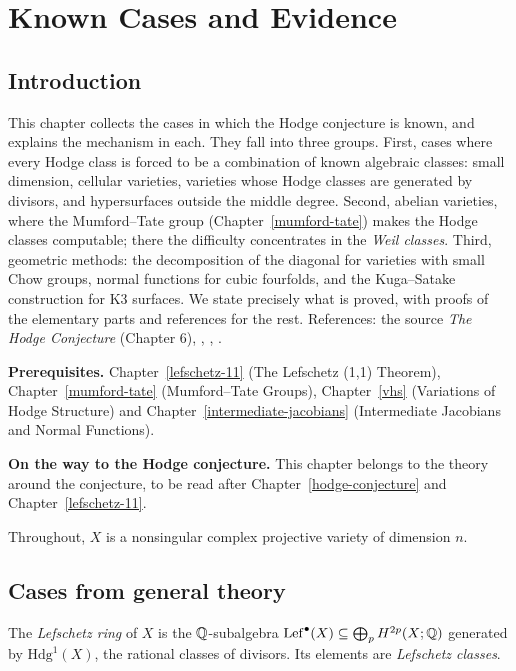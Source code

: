 \chapter{Known Cases and Evidence}\label{known-cases}

\section{Introduction}\label{known-cases:section-introduction}

This chapter collects the cases in which the Hodge conjecture is known, and explains the mechanism in each. They fall into three groups. First, cases where every Hodge class
is forced to be a combination of known algebraic classes: small dimension, cellular varieties, varieties whose Hodge classes are generated by divisors, and hypersurfaces outside the middle
degree. Second, abelian varieties, where the Mumford--Tate group (Chapter~\ref{mumford-tate}) makes the Hodge classes computable; there the difficulty concentrates in the \emph{Weil classes}.
Third, geometric methods: the decomposition of the diagonal for varieties with small Chow groups, normal functions for cubic fourfolds, and the Kuga--Satake construction for K3 surfaces.
We state precisely what is proved, with proofs of the elementary parts and references for the rest. References: the source \emph{The Hodge Conjecture} (Chapter 6),
\cite{lewis-survey}, \cite{birkenhake-lange}, \cite{voisin-hodge-2}.

\noindent\textbf{Prerequisites.} Chapter~\ref{lefschetz-11} (The Lefschetz (1,1) Theorem), Chapter~\ref{mumford-tate} (Mumford--Tate Groups), Chapter~\ref{vhs} (Variations of Hodge Structure) and
Chapter~\ref{intermediate-jacobians} (Intermediate Jacobians and Normal Functions).

\noindent\textbf{On the way to the Hodge conjecture.} This chapter belongs to the theory around the conjecture, to be read after Chapter~\ref{hodge-conjecture} and Chapter~\ref{lefschetz-11}.

Throughout, $X$ is a nonsingular complex projective variety of dimension $n$.

\section{Cases from general theory}\label{known-cases:section-general}

\begin{definition}\label{known-cases:definition-lefschetz-classes}
The \emph{Lefschetz ring} of $X$ is the $\mathbb{Q}$-subalgebra $\mathrm{Lef}^\bullet(X) \subseteq \bigoplus_pH^{2p}(X; \mathbb{Q})$ generated by $\mathrm{Hdg}^1(X)$, the rational classes of divisors. Its elements are
\emph{Lefschetz classes}.
\end{definition}

